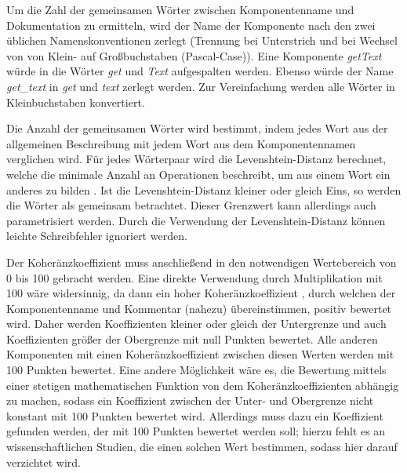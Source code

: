 Um die Zahl der  gemeinsamen Wörter zwischen Komponentenname und Dokumentation zu ermitteln, wird der Name der Komponente nach den zwei üblichen Namenskonventionen zerlegt (Trennung bei Unterstrich und bei Wechsel von von Klein- auf Großbuchstaben (Pascal-Case)). Eine Komponente \textit{getText} würde in die Wörter \textit{get} und \textit{Text} aufgespalten werden. Ebenso würde der Name \textit{get\_text} in  \textit{get} und \textit{text} zerlegt werden. Zur Vereinfachung werden alle Wörter in Kleinbuchstaben konvertiert. 

Die Anzahl der gemeinsamen Wörter wird bestimmt, indem jedes Wort aus der allgemeinen Beschreibung mit jedem Wort aus dem Komponentennamen verglichen wird. Für jedes Wörterpaar wird die Levenshtein-Distanz berechnet, welche die minimale Anzahl an Operationen beschreibt, um aus einem Wort ein anderes zu bilden \cite[S. 1091]{ANormalizedLevenshteinDistanceMetric}. Ist  die Levenshtein-Distanz kleiner oder gleich Eins, so werden die Wörter als gemeinsam betrachtet. Dieser Grenzwert kann allerdings auch parametrisiert werden. Durch die Verwendung der Levenshtein-Distanz können leichte Schreibfehler ignoriert werden. 

Der Koheränzkoeffizient muss anschließend in den notwendigen Wertebereich von 0 bis 100 gebracht werden. Eine direkte Verwendung durch Multiplikation mit 100 wäre widersinnig, da dann ein hoher Koheränzkoeffizient , durch welchen der Komponentenname  und Kommentar (nahezu) übereinstimmen, positiv bewertet wird. Daher werden Koeffizienten kleiner oder gleich der Untergrenze und auch Koeffizienten  größer der Obergrenze mit null Punkten bewertet. Alle anderen Komponenten mit einen Koheränzkoeffizient zwischen diesen Werten werden mit 100 Punkten bewertet. Eine andere Möglichkeit wäre es, die Bewertung mittels einer stetigen mathematischen Funktion von dem Koheränzkoeffizienten abhängig zu machen, sodass ein Koeffizient zwischen der Unter- und Obergrenze nicht konstant mit 100 Punkten bewertet wird. Allerdings muss dazu ein Koeffizient gefunden werden, der mit 100 Punkten bewertet werden soll; hierzu fehlt es an wissenschaftlichen Studien, die einen solchen Wert bestimmen, sodass hier darauf verzichtet wird. 

